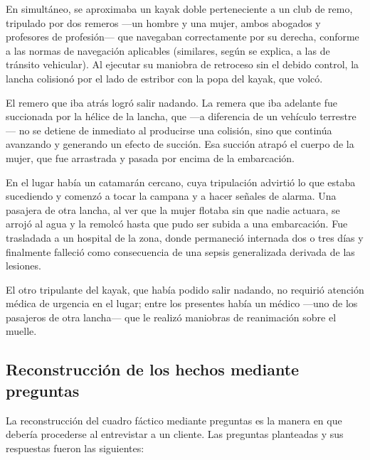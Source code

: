 \documentclass[12pt,oneside]{book}
\begin{document}
En simultáneo, se aproximaba un kayak doble perteneciente a un club de remo, tripulado por dos remeros ---un hombre y una mujer, ambos abogados y profesores de profesión--- que navegaban correctamente por su derecha, conforme a las normas de navegación aplicables (similares, según se explica, a las de tránsito vehicular). Al ejecutar su maniobra de retroceso sin el debido control, la lancha colisionó por el lado de estribor con la popa del kayak, que volcó.

El remero que iba atrás logró salir nadando. La remera que iba adelante fue succionada por la hélice de la lancha, que ---a diferencia de un vehículo terrestre--- no se detiene de inmediato al producirse una colisión, sino que continúa avanzando y generando un efecto de succión. Esa succión atrapó el cuerpo de la mujer, que fue arrastrada y pasada por encima de la embarcación.

En el lugar había un catamarán cercano, cuya tripulación advirtió lo que estaba sucediendo y comenzó a tocar la campana y a hacer señales de alarma. Una pasajera de otra lancha, al ver que la mujer flotaba sin que nadie actuara, se arrojó al agua y la remolcó hasta que pudo ser subida a una embarcación. Fue trasladada a un hospital de la zona, donde permaneció internada dos o tres días y finalmente falleció como consecuencia de una sepsis generalizada derivada de las lesiones.

El otro tripulante del kayak, que había podido salir nadando, no requirió atención médica de urgencia en el lugar; entre los presentes había un médico ---uno de los pasajeros de otra lancha--- que le realizó maniobras de reanimación sobre el muelle.

\subsection{Reconstrucción de los hechos mediante preguntas}

La reconstrucción del cuadro fáctico mediante preguntas es la manera en que debería procederse al entrevistar a un cliente. Las preguntas planteadas y sus respuestas fueron las siguientes:
\end{document}
